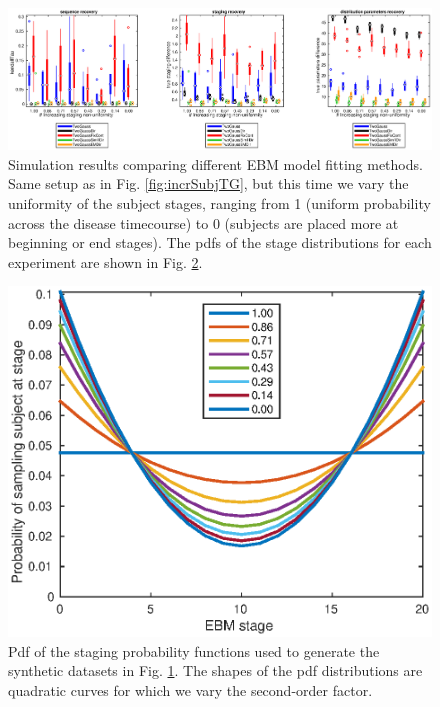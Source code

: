 \begin{figure}[H]
 \hspace{-2cm}
 \includegraphics[scale=\simFigScale]{images/ebm/synthetic/metricsTwoGauss_incrStagingUnif.eps}
 \caption{Simulation results comparing different EBM model fitting methods. Same setup as in Fig. \ref{fig:incrSubjTG}, but this time we vary the uniformity of the subject stages, ranging from 1 (uniform probability across the disease timecourse) to 0 (subjects are placed more at beginning or end stages). The pdfs of the stage distributions for each experiment are shown in Fig. \ref{fig:StagingCurvesTG}. }
  \label{fig:incrStagTG}
\end{figure}

\begin{figure}[H]
 \centering
 \hspace{-2cm}
 \includegraphics[scale=\simFigScale]{images/ebm/synthetic/stagingUnifCurves.eps}
 \caption{Pdf of the staging probability functions used to generate the synthetic datasets in Fig. \ref{fig:incrStagTG}. The shapes of the pdf distributions are quadratic curves for which we vary the second-order factor.}
 \label{fig:StagingCurvesTG}
\end{figure}

